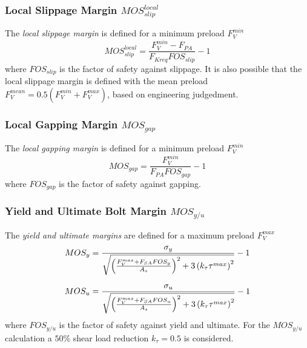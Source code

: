 \subsubsection{Local Slippage Margin $MOS_{slip}^{local}$}
The \emph{local slippage margin} is defined for a minimum preload $F_V^{min}$
\begin{equation}
  MOS_{slip}^{local} = \frac{F_V^{min}-F_{PA}}{F_{Kreq} FOS_{slip}}-1
\end{equation}
where $FOS_{slip}$ is the factor of safety against slippage. It is also possible that the local slippage 
margin is defined with the mean preload $F_V^{mean} = 0.5 (F_V^{min}+F_V^{max})$, based on engineering
judgedment. 
\subsubsection{Local Gapping Margin $MOS_{gap}$}
The \emph{local gapping margin} is defined for a minimum preload $F_V^{min}$
\begin{equation}
  MOS_{gap} = \frac{F_V^{min}}{F_{PA} FOS_{gap}}-1
\end{equation}
where $FOS_{gap}$ is the factor of safety against gapping. 
\subsubsection{Yield and Ultimate Bolt Margin $MOS_{y/u}$}
The \emph{yield and ultimate margins} are defined for a maximum preload $F_V^{max}$ 
\begin{subequations}
  \setlength{\jot}{10pt}
  \begin{align}
    MOS_{y} &= \frac{\sigma_y}{\sqrt{\left(\frac{F_V^{max}+F_{SA} FOS_y}{A_s}\right)^2 + 
      3\left(k_{\tau} \tau^{max}\right)^2}}-1 \\
    MOS_{u} &= \frac{\sigma_u}{\sqrt{\left(\frac{F_V^{max}+F_{SA} FOS_u}{A_s}\right)^2 + 
      3\left(k_{\tau} \tau^{max}\right)^2}}-1
  \end{align}
\end{subequations}
where $FOS_{y/u}$ is the factor of safety against yield and ultimate. For the $MOS_{y/u}$ calculation
a $50\%$ shear load reduction $k_{\tau} = 0.5$ is considered\footnotemark[2]
.